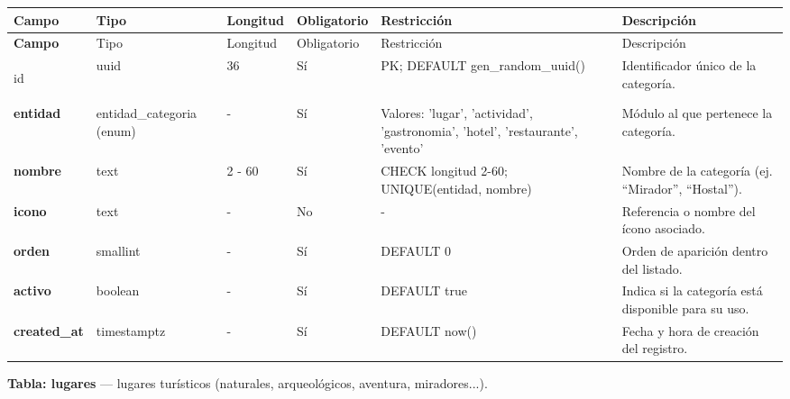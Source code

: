 {\footnotesize
\begin{longtable}{|>{\bfseries}p{3.3cm}|p{2.6cm}|p{1.2cm}|p{1.6cm}|p{2.8cm}|p{4.0cm}|}
\hline
Campo & Tipo & Longitud & Obligatorio & Restricción & Descripción \\ \hline
\endfirsthead
\hline
Campo & Tipo & Longitud & Obligatorio & Restricción & Descripción \\ \hline
\endhead
\hline
\endfoot
\hline
\endlastfoot

id & uuid & 36 & Sí & PK; DEFAULT gen\_random\_uuid() & Identificador único de la categoría. \\ \hline
entidad & entidad\_categoria (enum) & - & Sí & Valores: 'lugar', 'actividad', 'gastronomia', 'hotel', 'restaurante', 'evento' & Módulo al que pertenece la categoría. \\ \hline
nombre & text & 2 - 60 & Sí & CHECK longitud 2-60; UNIQUE(entidad, nombre) & Nombre de la categoría (ej. ``Mirador'', ``Hostal''). \\ \hline
icono & text & - & No & - & Referencia o nombre del ícono asociado. \\ \hline
orden & smallint & - & Sí & DEFAULT 0 & Orden de aparición dentro del listado. \\ \hline
activo & boolean & - & Sí & DEFAULT true & Indica si la categoría está disponible para su uso. \\ \hline
created\_at & timestamptz & - & Sí & DEFAULT now() & Fecha y hora de creación del registro. \\ \hline
\end{longtable}
}

\bigskip
\noindent\textbf{Tabla: lugares} — lugares turísticos (naturales, arqueológicos, aventura, miradores...).

